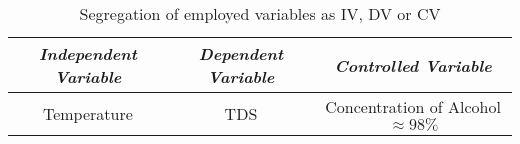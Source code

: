 

\begin{table}[H]
    \centering
        \begin{tabular}{|c|c|c|}
        \hline
        \hline
        \textit{Independent Variable} & \textit{Dependent Variable} & \textit{Controlled Variable} \\
        \hline
        \hline
        {Temperature} & {TDS} & {Concentration of Alcohol $\approx 98\%$} \\
        \hline
        \hline
        \end{tabular}
    \caption{{Segregation of employed variables as IV, DV or CV}}
\end{table}


